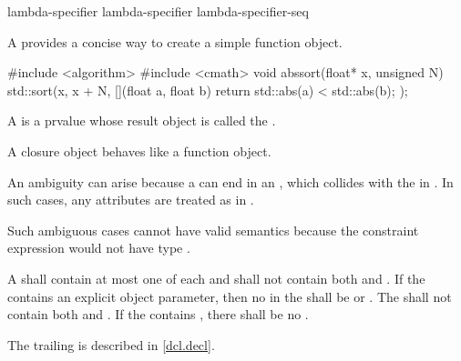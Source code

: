 \begin{bnf}
\br
    \br
    \br
    \br
\end{bnf}

\begin{bnf}
\br
    lambda-specifier\br
    lambda-specifier lambda-specifier-seq
\end{bnf}

\pnum
A  provides
a concise way to create a simple function object.
\begin{example}
\begin{codeblock}
#include <algorithm>
#include <cmath>
void abssort(float* x, unsigned N) {
  std::sort(x, x + N, [](float a, float b) { return std::abs(a) < std::abs(b); });
}
\end{codeblock}
\end{example}

\pnum
A  is a prvalue
whose result object is called the .
\begin{note}
A closure object behaves like a function
object.
\end{note}

\pnum
An ambiguity can arise
because a  can end in
an ,
which collides with
the  in .
In such cases,
any attributes are treated as
 in .
\begin{note}
Such ambiguous cases cannot have valid semantics
because the constraint expression would not have type .
\end{note}

\pnum
A 
shall contain at most one of each  and
shall not contain both  and .
If the  contains
an explicit object parameter,
then no  in the 
shall be  or .
The  shall not contain
both  and .
If the  contains ,
there shall be no .
\begin{note}
The trailing  is described in \ref{dcl.decl}.
\end{note}

